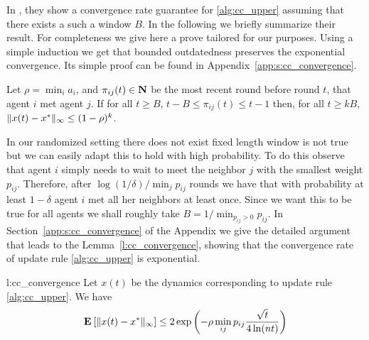 In \cite{BT97}, they show a convergence rate guarantee for
\ref{alg:cc_upper} assuming that there exists a such a window $B$.
In the  following we briefly summarize their result.  For completeness we
give here a prove tailored for our purposes.
Using a simple induction we get that bounded outdatedness
preserves the exponential convergence.  Its simple proof can be found in
Appendix~\ref{app:s:cc_convergence}.
\begin{lemma}\label{l:outdatedness_induction}
  Let $\rho = \min_i a_i$, and $\pi_{ij}(t) \in \bm{\mathrm{N}}$ be the most recent round
  before round $t$, that agent $i$ met agent $j$.
  If for all $t\geq B$, $t-B \leq \pi_{ij}(t) \leq t-1$ then, for
  all $t \geq k B$,
  \(\| x(t) - x^* \|_{\infty} \leq (1-\rho)^k\).
\end{lemma}

In our randomized setting there does not exist fixed length window is
not true but we can easily adapt this to hold with high probability.
To do this observe that agent $i$ simply needs to wait to meet the neighbor
$j$ with the smallest weight $p_{ij}$. Therefore, after
$\log(1/\delta)/\min_{j} p_{ij}$ rounds we have that with probability at least
$1-\delta$ agent $i$ met all her neighbors at least once.
Since we want this to be true for all agents
we shall roughly take $B = 1/\min_{p_{ij} > 0} {p_{ij}}$.
In Section~\ref{app:s:cc_convergence} of the Appendix we give the detailed
argument that leads to the Lemma~\ref{l:cc_convergence},
showing that the convergence rate of update rule \ref{alg:cc_upper} is exponential.
\begin{replemma}{l:cc_convergence}
  Let $x(t)$ be the dynamics corresponding
  to update rule \ref{alg:cc_upper}.
  We have
  \[
    \Exp{\norm{\infty}{x(t) - x^*}}
    \leq
    2\exp \lp(- \rho  \min_{ij} p_{ij} \frac{\sqrt{t}}{4\ln(nt)} \rp)
  \]
\end{replemma}
